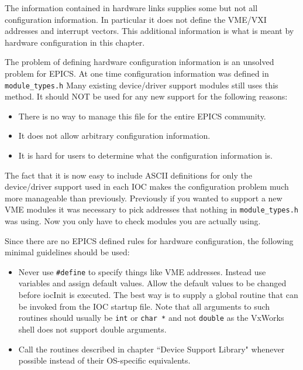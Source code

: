 The information contained in hardware links supplies some but not all configuration information. In particular it does not 
define the VME/VXI addresses and interrupt vectors. This additional information is what is meant by hardware 
configuration in this chapter.

The problem of defining hardware configuration information is an unsolved problem for EPICS. At one time 
configuration information was defined in \verb|module_types.h| Many existing device/driver support modules still uses this 
method. It should NOT be used for any new support for the following reasons:

\begin{itemize}
\item There is no way to manage this file for the entire EPICS community.

\item It does not allow arbitrary configuration information.

\item It is hard for users to determine what the configuration information is.

\end{itemize}

The fact that it is now easy to include ASCII definitions for only the device/driver support used in each IOC makes the 
configuration problem much more manageable than previously. Previously if you wanted to support a new VME modules 
it was necessary to pick addresses that nothing in \verb|module_types.h| was using. Now you only have to check modules 
you are actually using.

Since there are no EPICS defined rules for hardware configuration, the following minimal guidelines should be used:

\begin{itemize}

\item Never use \verb|#define| to specify things like VME addresses. Instead use variables and assign default values.
Allow the default values to be changed before iocInit is executed.
The best way is to supply a global routine that can be invoked from the IOC startup file.
Note that all arguments to such routines should usually be \verb|int| or \verb|char *| and not \verb|double| as the VxWorks shell does not support double arguments.

\item Call the routines described in chapter ``Device Support Library" whenever possible instead of their OS-specific equivalents.

\end{itemize}







